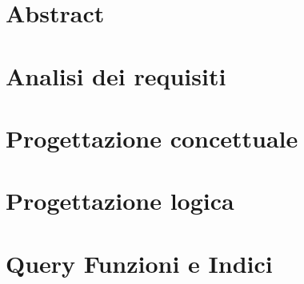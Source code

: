 \documentclass[a4paper,10pt]{report}
\begin{document}
    \tableofcontents

	\chapter{Abstract}
    
    
    \chapter{Analisi dei requisiti}
        

    \chapter{Progettazione concettuale}
        

    \chapter{Progettazione logica}
        

    \chapter{Query Funzioni e Indici}
        
\end{document}
